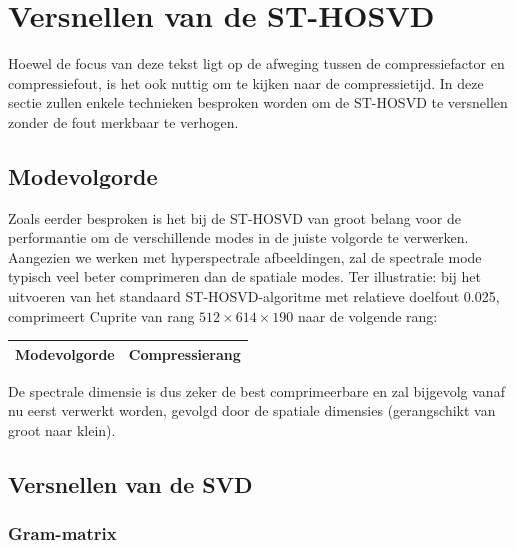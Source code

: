 \section{Versnellen van de ST-HOSVD}

Hoewel de focus van deze tekst ligt op de afweging tussen de compressiefactor en compressiefout, is het ook nuttig om te kijken naar de compressietijd. In deze sectie zullen enkele technieken besproken worden om de ST-HOSVD te versnellen zonder de fout merkbaar te verhogen.

\subsection{Modevolgorde}

Zoals eerder besproken is het bij de ST-HOSVD van groot belang voor de performantie om de verschillende modes in de juiste volgorde te verwerken. Aangezien we werken met hyperspectrale afbeeldingen, zal de spectrale mode typisch veel beter comprimeren dan de spatiale modes. Ter illustratie: bij het uitvoeren van het standaard ST-HOSVD-algoritme met relatieve doelfout 0.025, comprimeert Cuprite van rang $512 \times 614 \times 190$ naar de volgende rang:
\begin{table}[H]
\centering
\begin{tabular}{|l|l|}
\hline
Modevolgorde & Compressierang \\ \hline

\end{tabular}
\end{table}
De spectrale dimensie is dus zeker de best comprimeerbare en zal bijgevolg vanaf nu eerst verwerkt worden, gevolgd door de spatiale dimensies (gerangschikt van groot naar klein).

\subsection{Versnellen van de SVD}

\subsubsection{Gram-matrix}

